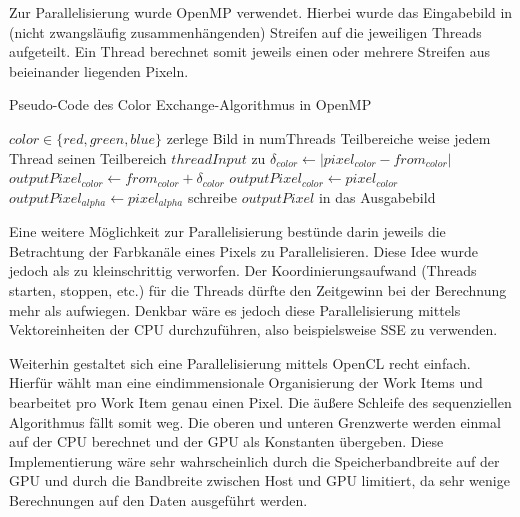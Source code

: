\documentclass[10pt,a4paper]{article}
\providecommand{\abs}[1]{\lvert#1\rvert}
\begin{document}
Zur Parallelisierung wurde OpenMP verwendet. Hierbei wurde das Eingabebild in (nicht zwangsläufig zusammenhängenden) Streifen auf die jeweiligen Threads aufgeteilt. Ein Thread berechnet somit jeweils einen oder mehrere Streifen aus beieinander liegenden Pixeln.

\begin{algorithm}[H]
\caption{Pseudo-Code des \glqq Color Exchange\grqq-Algorithmus in OpenMP}
\label{algo:exchange_par}
\begin{algorithmic}[1]
\State $color \in \{red, green, blue\}$
\State zerlege Bild in numThreads Teilbereiche
\State weise jedem Thread seinen Teilbereich $threadInput$ zu
  \State $\delta_{color} \gets \abs{ pixel_{color} - from_{color}}$    
      \State $outputPixel_{color} \gets from_{color} + \delta_{color}$
    \EndFor
  \Else
      \State $outputPixel_{color} \gets pixel_{color}$
    \EndFor
  \EndIf
  \State $outputPixel_{alpha} \gets pixel_{alpha}$
  \State schreibe $outputPixel$ in das Ausgabebild
\EndFor
\EndFor
\end{algorithmic}
\end{algorithm}
 
Eine weitere Möglichkeit zur Parallelisierung bestünde darin jeweils die Betrachtung der Farbkanäle eines Pixels zu Parallelisieren. Diese Idee wurde jedoch als zu kleinschrittig verworfen. Der Koordinierungsaufwand (Threads starten, stoppen, etc.) für die Threads dürfte den Zeitgewinn bei der Berechnung mehr als aufwiegen. Denkbar wäre es jedoch diese Parallelisierung mittels Vektoreinheiten der CPU durchzuführen, also beispielsweise SSE zu verwenden.

Weiterhin gestaltet sich eine Parallelisierung mittels OpenCL recht einfach. Hierfür wählt man eine eindimmensionale Organisierung der Work Items und bearbeitet pro Work Item genau einen Pixel. Die äußere Schleife des sequenziellen Algorithmus fällt somit weg. Die oberen und unteren Grenzwerte werden einmal auf der CPU berechnet und der GPU als Konstanten übergeben. Diese Implementierung wäre sehr wahrscheinlich durch die Speicherbandbreite auf der GPU und durch die Bandbreite zwischen Host und GPU limitiert, da sehr wenige Berechnungen auf den Daten ausgeführt werden.




\end{document}
